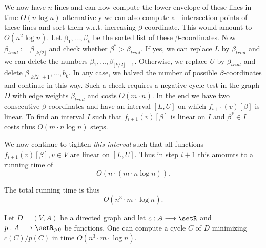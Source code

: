 We now have $n$ lines and can now compute the lower envelope of these
lines in time $O(n \log n)$ alternatively we can also compute all
intersection points of these lines and sort them w.r.t. increasing
$\beta$-coordinate. This would amount to $O(n^2 \log n)$.
Let $\beta_1,\ldots,\beta_k$ be the sorted list of  these  $\beta$-coordinates.
Now  $\beta_{trial}:= \beta_{\lfloor k/2\rfloor}$ and
check whether $\beta^*>\beta_{trial}$. If yes, we can replace $L$ by
$\beta_{trial}$ and we can delete the numbers
$\beta_1,\ldots,\beta_{\lfloor k/2\rfloor-1}$. Otherwise, we replace $U$ by $\beta_{trial}$ and
delete $\beta_{\lfloor k/2\rfloor+1},\ldots,b_k$. In
any case, 
we halved the number of possible $\beta$-coordinates and continue in this
way.  Such a check requires a negative cycle test in the graph
$D$ with edge weights $\beta_{trial}$ and costs $O(m \cdot n)$. In the end we have two consecutive $\beta$-coordinates and have an
interval $[L,U]$ on which  $f_{i+1}(v)[\beta]$ is linear.  To  find
an interval $I$ such that $f_{i+1}(v)[\beta]$ is linear on $I$ and $\beta^*
\in I$ costs thus $O(m \cdot n \log n)$ steps. 


We now continue to tighten \emph{this interval} such that all functions
$f_{i+1}(v)[\beta], v \in V$ are linear on $[L,U]$.  Thus in step $i+1$ this
amounts to a running time of 
\begin{displaymath}
  O\left(n \cdot ( m \cdot n \log n) \right). 
\end{displaymath}

The total running time  is thus 
\begin{displaymath}
  O(n^3 \cdot m \cdot \log n).  
\end{displaymath}

\begin{theorem}
  \label{thr:2}
  Let $D=(V,A)$ be a directed graph and let $c: A \longrightarrow\setR$ and
  $p:A\longrightarrow\setR_{>0}$ be functions. One can compute a cycle $C$ of $D$
  minimizing $c(C)/p(C)$ in time  $O(n^3 \cdot m \cdot \log n)$.  
\end{theorem}


